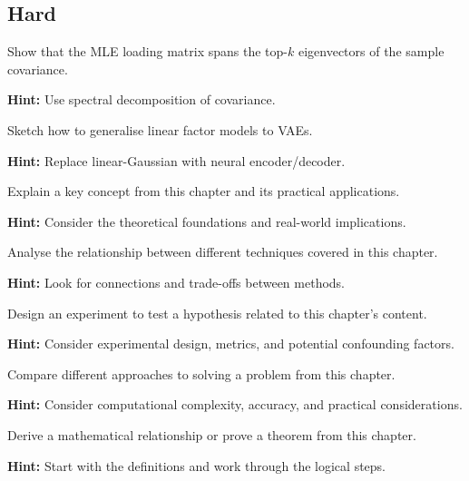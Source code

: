 \subsection*{Hard}

\begin{problem}
Show that the MLE loading matrix spans the top-$k$ eigenvectors of the sample covariance.

\textbf{Hint:} Use spectral decomposition of covariance.
\end{problem}

\begin{problem}
Sketch how to generalise linear factor models to VAEs.

\textbf{Hint:} Replace linear-Gaussian with neural encoder/decoder.
\end{problem}



\begin{problem}
Explain a key concept from this chapter and its practical applications.

\textbf{Hint:} Consider the theoretical foundations and real-world implications.
\end{problem}

\begin{problem}
Analyse the relationship between different techniques covered in this chapter.

\textbf{Hint:} Look for connections and trade-offs between methods.
\end{problem}

\begin{problem}
Design an experiment to test a hypothesis related to this chapter's content.

\textbf{Hint:} Consider experimental design, metrics, and potential confounding factors.
\end{problem}

\begin{problem}
Compare different approaches to solving a problem from this chapter.

\textbf{Hint:} Consider computational complexity, accuracy, and practical considerations.
\end{problem}

\begin{problem}
Derive a mathematical relationship or prove a theorem from this chapter.

\textbf{Hint:} Start with the definitions and work through the logical steps.
\end{problem}

